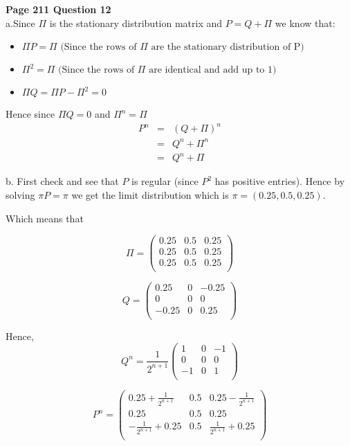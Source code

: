 \documentclass[10pt,a4paper]{article}
\begin{document}
\begin{flushleft}
\begin{eqnarray*}
\\
\end{eqnarray*}

\textbf{Page 211 Question 12}\\

a.Since $\Pi$ is the stationary distribution matrix and $P =
Q+\Pi$ we know that:
\begin{itemize}
    \item $\Pi P = \Pi \mbox{ (Since the rows of $\Pi$ are the stationary distribution of P) } $
    \item $ \Pi^2= \Pi \mbox{ (Since the rows of $\Pi$ are identical and add up to 1) } $
    \item $\Pi Q = \Pi P -\Pi^2 = 0$
\end{itemize}

Hence since $\Pi Q = 0$ and $\Pi^n=\Pi$
\begin{eqnarray*}
P^n &=& (Q+\Pi)^n\\
 &=& Q^n+\Pi^n\\
 &=& Q^n+\Pi
\end{eqnarray*}

b. First check and see that $P$ is regular (since $P^2$ has
positive entries). Hence by solving $\pi P = \pi$ we get the limit
distribution which is $\pi = (0.25,0.5,0.25)$.

Which means that

\[ \Pi = \left ( \begin{array}{ccc}
 0.25 & 0.5 & 0.25 \\
 0.25 & 0.5 & 0.25 \\
 0.25 & 0.5 & 0.25 \\
\end{array} \right) \]


\[ Q = \left ( \begin{array}{ccc}
 0.25 & 0 & -0.25 \\
 0 & 0 & 0 \\
 -0.25 & 0 & 0.25 \\
\end{array} \right) \]

Hence,
\[ Q^n = \frac{1}{2^{n+1}}\left ( \begin{array}{ccc}
 1 & 0 & -1 \\
 0 & 0 & 0 \\
 -1 & 0 & 1 \\
\end{array} \right) \]

\[ P^n = \left ( \begin{array}{ccc}
 0.25+\frac{1}{2^{n+1}} & 0.5 & 0.25-\frac{1}{2^{n+1}} \\
 0.25 & 0.5 & 0.25 \\
 -\frac{1}{2^{n+1}}+0.25 & 0.5 & \frac{1}{2^{n+1}}+0.25 \\
\end{array} \right) \]


\begin{eqnarray*}
\\
\end{eqnarray*}

\end{flushleft}
\end{document}
